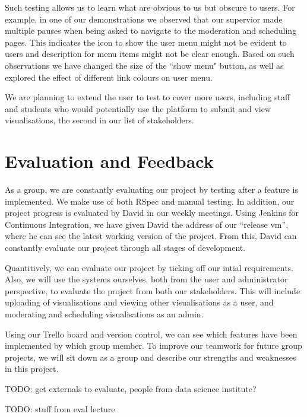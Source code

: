 \documentclass[a4paper]{article}
\begin{document}
Such testing allows us to learn what are obvious to us but obscure to users.
For example, in one of our demonstrations we observed that our supervior 
made multiple pauses when
being asked to navigate to the moderation and scheduling pages. This 
indicates the icon to show the user menu might not be evident to users and
description for menu items might not be clear enough. Based on such observations
we have changed the size of the ``show menu" button, as well as explored the effect
of different link colours on user menu.

We are planning to extend the user to test to cover more users, including staff
and students who would potentially use the platform to submit and 
view visualisations, the second in our list of stakeholders.

\section{Evaluation and Feedback}
As a group, we are constantly evaluating our project by testing after a 
feature is implemented. We make use of both RSpec and manual testing. In 
addition, our project progress is evaluated by David in our weekly 
meetings. Using Jenkins for Continuous Integration, we have given David
the address of our ``release vm'', where he can see the latest working 
version of the project. From this, David can constantly evaluate our project 
through all stages of development.

Quantitively, we can evaluate our project by ticking off our intial 
requirements. Also, we will use the systems ourselves, both from the user 
and administrator perspective, to evaluate the project from both our stakeholders.
This will include uploading of visualisations and viewing other visualisations as a
user, and moderating and scheduling visualisations as an admin.

Using our Trello board and version control, we can see which features have been 
implemented by which group member. To improve our teamwork for future group 
projects, we will sit down as a group and describe our strengths and weaknesses in 
this project.

TODO: get externals to evaluate, people from data science institute? 

TODO: stuff from eval lecture
\end{document}
